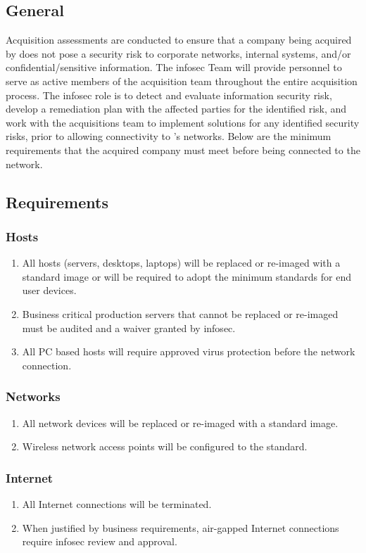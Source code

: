 \subsection{General}
Acquisition assessments are conducted to ensure that a company being acquired by \CompanyName{} does not pose a security risk to corporate networks, internal systems, and/or confidential/sensitive information.  
The \gls{infosec} Team will provide personnel to serve as active members of the acquisition team throughout the entire acquisition process.  
The \gls{infosec} role is to detect and evaluate information security risk, develop a remediation plan with the affected parties for the identified risk, and work with the acquisitions team to implement solutions for any identified security risks, prior to allowing connectivity to \CompanyName{}'s networks.  
Below are the minimum requirements that the acquired company must meet before being connected to the \CompanyName{} network. 
\subsection{Requirements}
\subsubsection{Hosts}
\begin{enumerate}
\item
All hosts (servers, desktops, laptops) will be replaced or re-imaged with a \CompanyName{} standard image or will be required to adopt the minimum standards for end user devices.
\item
Business critical production servers that cannot be replaced or re-imaged must be audited and a waiver granted by \gls{infosec}.
\item
All PC based hosts will require \CompanyName{} approved virus protection before the network connection. 
\end{enumerate}
\subsubsection{Networks}
\begin{enumerate}
\item
All network devices will be replaced or re-imaged with a \CompanyName{} standard image. 
\item
Wireless network access points will be configured to the \CompanyName{} standard. 
\end{enumerate}
\subsubsection{Internet}
\begin{enumerate}
\item
All Internet connections will be terminated. 
\item
When justified by business requirements, air-gapped Internet connections require \gls{infosec} review and approval. 
\end{enumerate}
